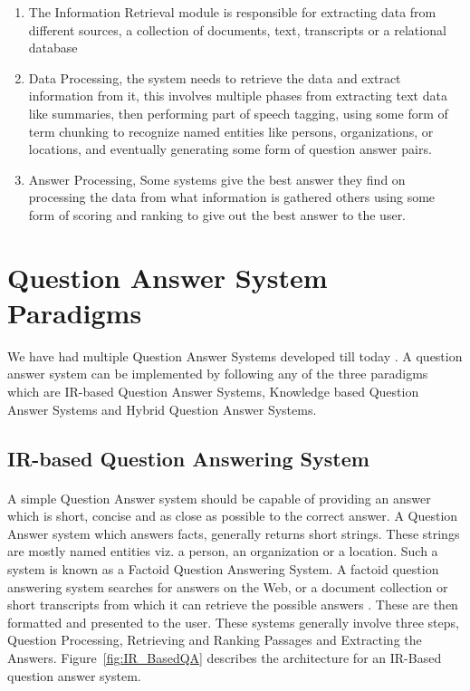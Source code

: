 \begin{enumerate}
\item The Information Retrieval module is responsible for extracting data from different sources, a collection of documents, text, transcripts or a relational database
\item Data Processing, the system needs to retrieve the data and extract information from it, this involves multiple phases from extracting text data like summaries, then performing part of speech tagging, using some form of term chunking to recognize named entities like persons, organizations, or locations, and eventually generating some form of question answer pairs.
\item Answer Processing, Some systems give the best answer they find on processing the data from what information is gathered others using some form of scoring and ranking to give out the best answer to the user.
\end{enumerate}

\section{Question Answer System Paradigms}
We have had multiple Question Answer Systems developed till today \cite {katz1997annotating} \cite {zheng2002answerbus}.
A question answer system can be implemented by following any of the three paradigms \cite {wongso2016literature} which are IR-based Question Answer Systems, Knowledge based Question Answer Systems and Hybrid Question Answer Systems.

\subsection{IR-based Question Answering System}
\paragraph{}
A simple Question Answer system should be capable of providing an answer which is short, concise and as close as possible to the correct answer. A Question Answer system which answers facts, generally returns short strings. These strings are mostly named entities viz. a person, an organization or a location. Such a system is known as a Factoid Question Answering System. A factoid question answering system searches for answers on the Web, or a document collection or short transcripts from which it can retrieve the possible answers \cite {chopra2016named}. These are then formatted and presented to the user. These systems generally involve three steps, Question Processing, Retrieving and Ranking Passages and Extracting the Answers. Figure~\ref{fig:IR_BasedQA} describes the architecture for an IR-Based question answer system.


